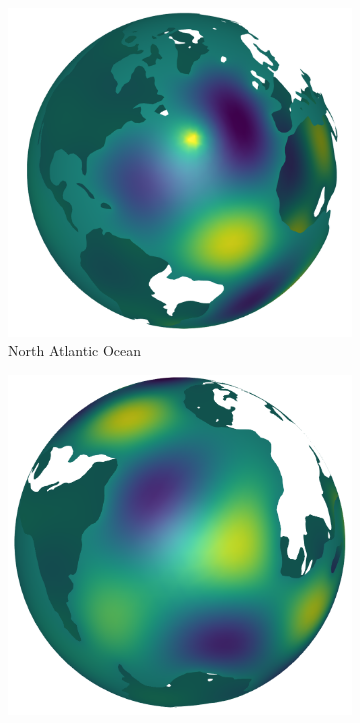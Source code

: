 \documentclass[a4paper]{article}
\begin{document}
\begin{figure}
    \centering
    \begin{subfigure}[b]{0.475\textwidth}
        \centering
        \includegraphics[width=\textwidth]{./images/shot_NAtl.png}
        \caption[]%
        {{\small North Atlantic Ocean}}    
        \label{fig:sub1}
    \end{subfigure}
    \hfill
    \begin{subfigure}[b]{0.46\textwidth}  
        \centering 
        \includegraphics[width=\textwidth]{./images/shot_SAtl.png}

\end{subfigure}
\end{figure}
\end{document}
